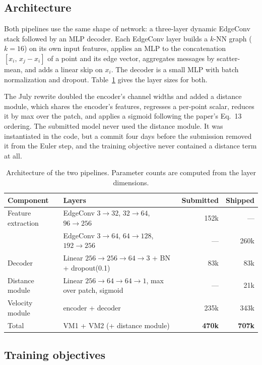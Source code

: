\documentclass{article}
\begin{document}
\subsection{Architecture}

Both pipelines use the same shape of network: a three-layer dynamic EdgeConv stack followed by an MLP decoder. Each EdgeConv layer builds a $k$-NN graph ($k=16$) on its own input features, applies an MLP to the concatenation $[x_i,\, x_j - x_i]$ of a point and its edge vector, aggregates messages by scatter-mean, and adds a linear skip on $x_i$. The decoder is a small MLP with batch normalization and dropout. Table~\ref{tab:arch} gives the layer sizes for both.

The July rewrite doubled the encoder's channel widths and added a distance module, which shares the encoder's features, regresses a per-point scalar, reduces it by max over the patch, and applies a sigmoid following the paper's Eq.~13 ordering. The submitted model never used the distance module. It was instantiated in the code, but a commit four days before the submission removed it from the Euler step, and the training objective never contained a distance term at all.

\begin{table}[t]
  \caption{Architecture of the two pipelines. Parameter counts are computed from the layer dimensions.}
  \label{tab:arch}
  \centering
  \small
  \begin{tabular}{@{}llrr@{}}
    \toprule
    Component & Layers & Submitted & Shipped \\
    \midrule
    Feature extraction & EdgeConv $3{\to}32$, $32{\to}64$, $96{\to}256$ & 152k & --- \\
                       & EdgeConv $3{\to}64$, $64{\to}128$, $192{\to}256$ & --- & 260k \\
    Decoder & Linear $256{\to}256{\to}64{\to}3$ + BN + dropout(0.1) & 83k & 83k \\
    Distance module & Linear $256{\to}64{\to}64{\to}1$, max over patch, sigmoid & --- & 21k \\
    \midrule
    Velocity module & encoder + decoder & 235k & 343k \\
    Total & VM1 + VM2 (+ distance module) & \textbf{470k} & \textbf{707k} \\
    \bottomrule
  \end{tabular}
\end{table}

\subsection{Training objectives}
\end{document}
